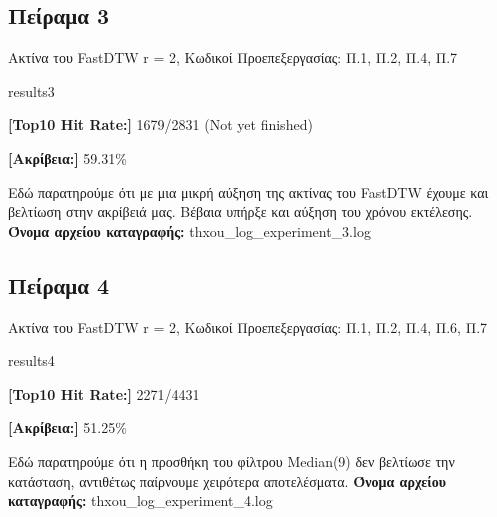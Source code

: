 \subsection{Πείραμα 3}
Ακτίνα του FastDTW r = 2, Κωδικοί Προεπεξεργασίας: Π.1, Π.2, Π.4, Π.7
\begin{labeling}{results3}
  \item \textbf{[Top10 Hit Rate:]} 1679/2831 (Not yet finished)
  \item \textbf{[Ακρίβεια:]} 59.31\%
\end{labeling}
Εδώ παρατηρούμε ότι με μια μικρή αύξηση της ακτίνας του FastDTW έχουμε και βελτίωση στην ακρίβειά μας.
Βέβαια υπήρξε και αύξηση του χρόνου εκτέλεσης.
\textbf{Όνομα αρχείου καταγραφής:} thxou\_log\_experiment\_3.log

\subsection{Πείραμα 4}
Ακτίνα του FastDTW r = 2, Κωδικοί Προεπεξεργασίας: Π.1, Π.2, Π.4, Π.6, Π.7
\begin{labeling}{results4}
  \item \textbf{[Top10 Hit Rate:]} 2271/4431
  \item \textbf{[Ακρίβεια:]} 51.25\%
\end{labeling}
Εδώ παρατηρούμε ότι η προσθήκη του φίλτρου Median(9) δεν βελτίωσε την κατάσταση, αντιθέτως παίρνουμε χειρότερα αποτελέσματα.
\textbf{Όνομα αρχείου καταγραφής:} thxou\_log\_experiment\_4.log

